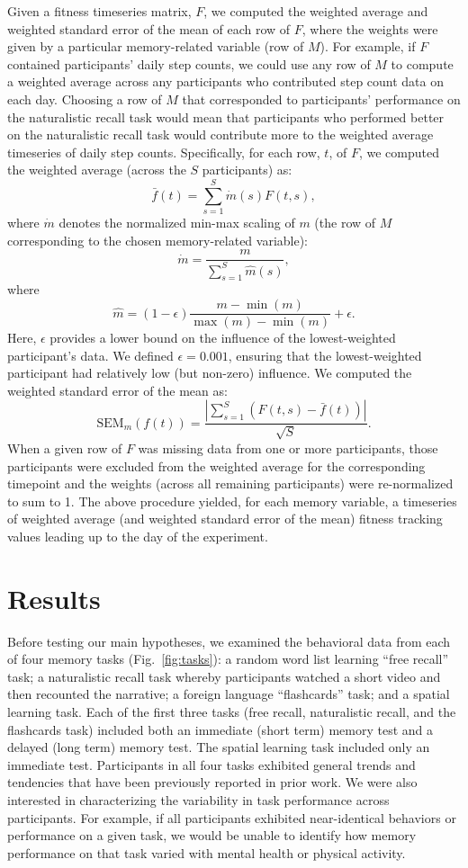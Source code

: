 \documentclass[10pt]{article}
\begin{document}
Given a fitness timeseries matrix, $F$, we computed the weighted
average and weighted standard error of the mean of each row of $F$,
where the weights were given by a particular memory-related variable
(row of $M$).  For example, if $F$ contained participants' daily step
counts, we could use any row of $M$ to compute a weighted average
across any participants who contributed step count data on each day.
Choosing a row of $M$ that corresponded to participants' performance
on the naturalistic recall task would mean that participants who
performed better on the naturalistic recall task would contribute more
to the weighted average timeseries of daily step counts.
Specifically, for each row, $t$, of $F$, we computed the weighted
average (across the $S$ participants) as:
\[
\bar{f}(t) = \sum_{s=1}^S \dot{m}(s) F(t, s),
\]
where $\dot{m}$ denotes the normalized min-max scaling of $m$ (the row
of $M$ corresponding to the chosen memory-related variable):
\[
  \dot{m} = \frac{m}{\sum_{s=1}^S \hat{m}(s)},
\]
where
\[
  \hat{m} = (1 - \epsilon)\frac{m - \min(m)}{\max(m) - \min(m)} + \epsilon.
\]
Here, $\epsilon$ provides a lower bound on the influence of the
lowest-weighted participant's data.  We defined $\epsilon = 0.001$,
ensuring that the lowest-weighted participant had relatively low (but
non-zero) influence.  We computed the weighted standard error of the
mean as:
\[
\mathrm{SEM}_m\left(f(t)\right) = \frac{\left| \sum_{s=1}^S \left( F(t, s) -
    \bar{f}(t)\right) \right|}{\sqrt{S}}.
\]
When a given row of $F$ was missing data from one or more
participants, those participants were excluded from the weighted
average for the corresponding timepoint and the weights (across all
remaining participants) were re-normalized to sum to 1.  The above
procedure yielded, for each memory variable, a timeseries of weighted
average (and weighted standard error of the mean) fitness tracking
values leading up to the day of the experiment.

\section*{Results}
Before testing our main hypotheses, we examined the behavioral data
from each of four memory tasks (Fig.~\ref{fig:tasks}): a random word list learning ``free
recall'' task; a naturalistic recall task whereby participants watched
a short video and then recounted the narrative; a foreign language
``flashcards'' task; and a spatial learning task.  Each of the first
three tasks (free recall, naturalistic recall, and the flashcards
task) included both an immediate (short term) memory test and a
delayed (long term) memory test.  The spatial learning task included
only an immediate test. Participants in all four tasks exhibited
general trends and tendencies that have been previously reported in
prior work.  We were also interested in characterizing the variability
in task performance across participants.  For example, if all
participants exhibited near-identical behaviors or performance on a
given task, we would be unable to identify how memory performance on
that task varied with mental health or physical activity.
\end{document}
